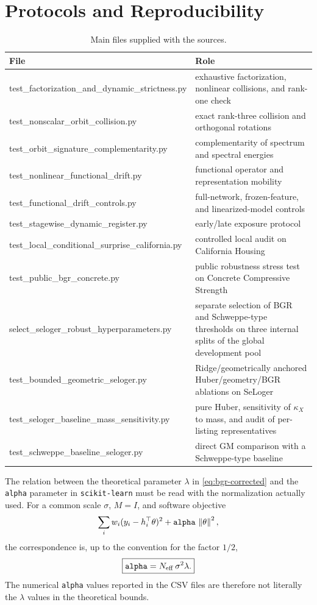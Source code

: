 \section{Protocols and Reproducibility}
\label{app:protocols}
\begin{table}[H]
\centering
\caption{Main files supplied with the sources.}
\small
\begin{tabularx}{\textwidth}{@{}>{\raggedright\arraybackslash\ttfamily\scriptsize}p{}X@{}}
\toprule
File & Role \\
\midrule
test\_factorization\_and\_dynamic\_strictness.py & exhaustive factorization, nonlinear collisions, and rank-one check \\
test\_nonscalar\_orbit\_collision.py & exact rank-three collision and orthogonal rotations \\
test\_orbit\_signature\_complementarity.py & complementarity of spectrum and spectral energies \\
test\_nonlinear\_functional\_drift.py & functional operator and representation mobility \\
test\_functional\_drift\_controls.py & full-network, frozen-feature, and linearized-model controls \\
test\_stagewise\_dynamic\_register.py & early/late exposure protocol \\
test\_local\_conditional\_surprise\_california.py & controlled local audit on California Housing \\
test\_public\_bgr\_concrete.py & public robustness stress test on Concrete Compressive Strength \\
select\_seloger\_robust\_hyperparameters.py & separate selection of BGR and Schweppe-type thresholds on three internal splits of the global development pool \\
test\_bounded\_geometric\_seloger.py & Ridge/geometrically anchored Huber/geometry/BGR ablations on SeLoger \\
test\_seloger\_baseline\_mass\_sensitivity.py & pure Huber, sensitivity of $\kappa_X$ to mass, and audit of per-listing representatives \\
test\_schweppe\_baseline\_seloger.py & direct GM comparison with a Schweppe-type baseline \\
\bottomrule
\end{tabularx}
\end{table}
The relation between the theoretical parameter $\lambda$ in \eqref{eq:bgr-corrected} and the \texttt{alpha} parameter in \texttt{scikit-learn} must be read with the normalization actually used. For a common scale $\sigma$, $M=I$, and software objective
\[
\sum_i w_i(y_i-h_i^\top\theta)^2+\texttt{alpha}\,\left\lVert \theta\right\rVert^2,
\]
the correspondence is, up to the convention for the factor $1/2$,
\[
\boxed{\texttt{alpha}=N_{\rm eff}\,\sigma^2\lambda.}
\]
The numerical \texttt{alpha} values reported in the CSV files are therefore not literally the $\lambda$ values in the theoretical bounds.

